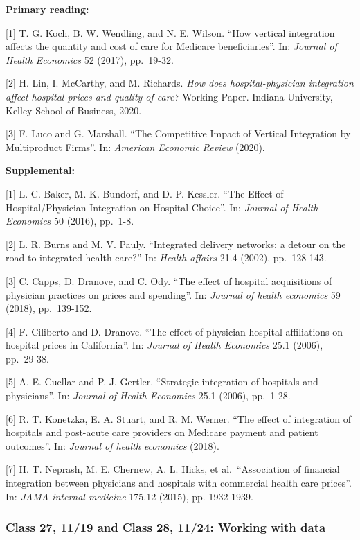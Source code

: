 \documentclass[11pt,]{article}
\begin{document}
\textbf{Primary reading:}

{[}1{]} T. G. Koch, B. W. Wendling, and N. E. Wilson. ``How vertical
integration affects the quantity and cost of care for Medicare
beneficiaries''. In: \emph{Journal of Health Economics} 52 (2017),
pp.~19-32.

{[}2{]} H. Lin, I. McCarthy, and M. Richards. \emph{How does
hospital-physician integration affect hospital prices and quality of
care?} Working Paper. Indiana University, Kelley School of Business,
2020.

{[}3{]} F. Luco and G. Marshall. ``The Competitive Impact of Vertical
Integration by Multiproduct Firms''. In: \emph{American Economic Review}
(2020).

\textbf{Supplemental:}

{[}1{]} L. C. Baker, M. K. Bundorf, and D. P. Kessler. ``The Effect of
Hospital/Physician Integration on Hospital Choice''. In: \emph{Journal
of Health Economics} 50 (2016), pp.~1-8.

{[}2{]} L. R. Burns and M. V. Pauly. ``Integrated delivery networks: a
detour on the road to integrated health care?'' In: \emph{Health
affairs} 21.4 (2002), pp.~128-143.

{[}3{]} C. Capps, D. Dranove, and C. Ody. ``The effect of hospital
acquisitions of physician practices on prices and spending''. In:
\emph{Journal of health economics} 59 (2018), pp.~139-152.

{[}4{]} F. Ciliberto and D. Dranove. ``The effect of physician-hospital
affiliations on hospital prices in California''. In: \emph{Journal of
Health Economics} 25.1 (2006), pp.~29-38.

{[}5{]} A. E. Cuellar and P. J. Gertler. ``Strategic integration of
hospitals and physicians''. In: \emph{Journal of Health Economics} 25.1
(2006), pp.~1-28.

{[}6{]} R. T. Konetzka, E. A. Stuart, and R. M. Werner. ``The effect of
integration of hospitals and post-acute care providers on Medicare
payment and patient outcomes''. In: \emph{Journal of health economics}
(2018).

{[}7{]} H. T. Neprash, M. E. Chernew, A. L. Hicks, et al.~``Association
of financial integration between physicians and hospitals with
commercial health care prices''. In: \emph{JAMA internal medicine}
175.12 (2015), pp. 1932-1939.

\hypertarget{class-27-1119-and-class-28-1124-working-with-data}{%
\subsubsection{Class 27, 11/19 and Class 28, 11/24: Working with
data}\label{class-27-1119-and-class-28-1124-working-with-data}}
\end{document}
